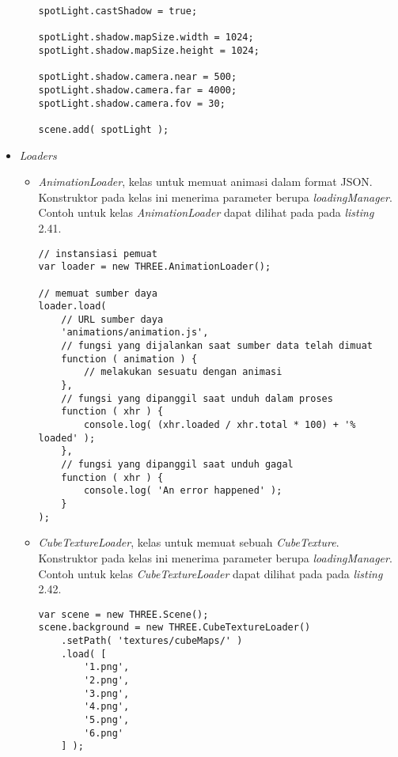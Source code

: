 \begin{itemize}
\begin{itemize}
\begin{lstlisting}[caption={Contoh penggunaan kelas {\it SpotLight}.},captionpos=b]
spotLight.castShadow = true;

spotLight.shadow.mapSize.width = 1024;
spotLight.shadow.mapSize.height = 1024;

spotLight.shadow.camera.near = 500;
spotLight.shadow.camera.far = 4000;
spotLight.shadow.camera.fov = 30;

scene.add( spotLight );
\end{lstlisting}

	\end{itemize}
	
\item \textit{Loaders}

	\begin{itemize}
	\item {\it AnimationLoader}, kelas untuk memuat animasi dalam format JSON. Konstruktor pada kelas ini menerima parameter berupa {\it loadingManager}. Contoh untuk kelas {\it AnimationLoader} dapat dilihat pada pada {\it listing} 2.41.
	
\begin{lstlisting}[caption={Contoh penggunaan kelas {\it AnimationLoader}.},captionpos=b]
// instansiasi pemuat
var loader = new THREE.AnimationLoader();

// memuat sumber daya
loader.load(
	// URL sumber daya
	'animations/animation.js',
	// fungsi yang dijalankan saat sumber data telah dimuat
	function ( animation ) {
		// melakukan sesuatu dengan animasi
	},
	// fungsi yang dipanggil saat unduh dalam proses
	function ( xhr ) {
		console.log( (xhr.loaded / xhr.total * 100) + '% loaded' );
	},
	// fungsi yang dipanggil saat unduh gagal
	function ( xhr ) {
		console.log( 'An error happened' );
	}
);
\end{lstlisting}

	\item {\it CubeTextureLoader}, kelas untuk memuat sebuah {\it CubeTexture}. Konstruktor pada kelas ini menerima parameter berupa  {\it loadingManager}. Contoh untuk kelas {\it CubeTextureLoader} dapat dilihat pada pada {\it listing} 2.42.
	
\begin{lstlisting}[caption={Contoh penggunaan kelas {\it CubeTextureLoader} menggunakan gambar dengan format PNG di setiap sisinya.},captionpos=b]
var scene = new THREE.Scene();
scene.background = new THREE.CubeTextureLoader()
	.setPath( 'textures/cubeMaps/' )
	.load( [
		'1.png',
		'2.png',
		'3.png',
		'4.png',
		'5.png',
		'6.png'
	] );
\end{lstlisting}


\end{itemize}
\end{itemize}
